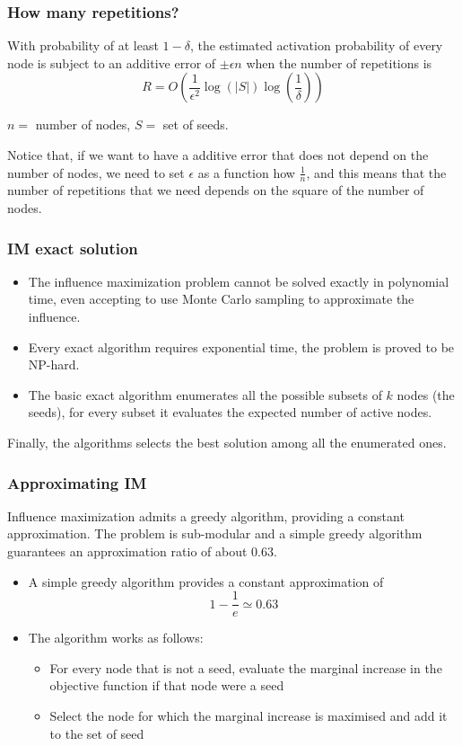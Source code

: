 \documentclass[10pt,a4paper]{article}
\begin{document}
\subsubsection{How many repetitions?}\label{how-many-repetitions}

With probability of at least $1-\delta$, the estimated activation probability of every node is subject to an additive error of $\pm \epsilon n$ when the number of repetitions is
$$R = O\left(\frac{1}{\epsilon^2} \log{\left(|S|\right)} \log{\left(\frac{1}{\delta}\right)}\right)$$

$n =$ number of nodes, $S=$ set of seeds.

Notice that, if we want to have a additive error that does not depend on the number of nodes, we need to set $\epsilon$ as a function how $\frac{1}{n}$, and this means that the number of repetitions that we need depends on the square of the number of nodes.

\subsubsection{IM exact solution}\label{im-exact-solution}

\begin{itemize}

\item The influence maximization problem cannot be solved exactly in polynomial time, even accepting to use Monte Carlo sampling to approximate the influence.
\item Every exact algorithm requires exponential time, the problem is proved to be NP-hard.
\item The basic exact algorithm enumerates all the possible subsets of $k$ nodes (the seeds), for every subset it evaluates the expected number of active nodes.
\end{itemize}

Finally, the algorithms selects the best solution among all the enumerated ones.

\subsubsection{Approximating IM}\label{approximating-im}

Influence maximization admits a greedy algorithm, providing a constant approximation. The problem is sub-modular and a simple greedy algorithm guarantees an approximation ratio of about $0.63$.

\begin{itemize}
\item A simple greedy algorithm provides a constant approximation of
$$1-\frac{1}{e} \simeq 0.63$$
\item The algorithm works as follows:
\begin{itemize}
\item For every node that is not a seed, evaluate the marginal increase in the objective function if that node were a seed
\item Select the node for which the marginal increase is maximised and add it to the set of seed
\end{itemize}
\end{itemize}
\end{document}
